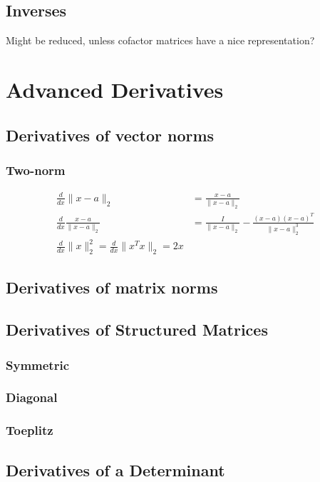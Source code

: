 \documentclass[oneside]{book}
\begin{document}
\section{Inverses}
Might be reduced, unless cofactor matrices have a nice representation?



\chapter{Advanced Derivatives}

\section{Derivatives of vector norms}

\subsection{Two-norm}
\begin{align}
   \frac{d}{dx}\|x-a\|_2 &= \frac{x-a}{\|x-a\|_2}
   \\
   \frac{d}{dx}\frac{x-a}{\|x-a\|_2} &= \frac{I}{\|x-a\|_2} - \frac{(x-a)(x-a)^T}{\|x-a\|_2^3}
   \\
   \frac{d}{dx}\|x\|_2^2 = \frac{d}{dx}\|x^T x\|_2 = 2x
\end{align}

\section{Derivatives of matrix norms}

\section{Derivatives of Structured Matrices}

\subsection{Symmetric}
\subsection{Diagonal}
\subsection{Toeplitz}

\section{Derivatives of a Determinant}
\end{document}
